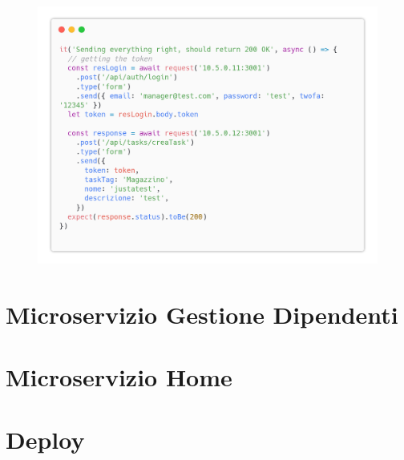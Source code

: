 \documentclass{report}
\begin{document}
\begin{figure}[H]
	\centering\includegraphics[width=1\textwidth]{images/code_crea_task_test6.png}
\end{figure}



\chapter{Microservizio Gestione Dipendenti}

\chapter{Microservizio Home}

\chapter{Deploy}

	
\end{document}
